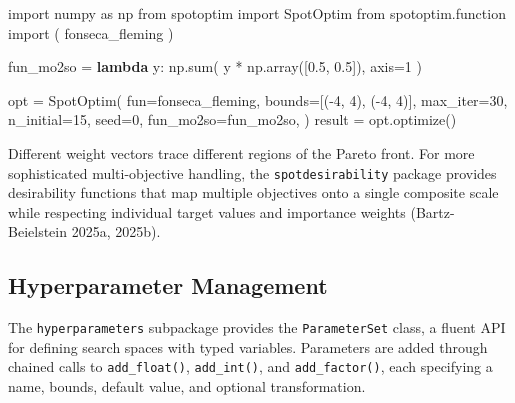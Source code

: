 \documentclass[
  twocolumn]{article}
\newenvironment{Shaded}{\begin{snugshade}}{\end{snugshade}}
\newcommand{\BuiltInTok}[1]{\textcolor[rgb]{0.00,0.23,0.31}{#1}}
\newcommand{\DecValTok}[1]{\textcolor[rgb]{0.68,0.00,0.00}{#1}}
\newcommand{\FloatTok}[1]{\textcolor[rgb]{0.68,0.00,0.00}{#1}}
\newcommand{\ImportTok}[1]{\textcolor[rgb]{0.00,0.46,0.62}{#1}}
\newcommand{\KeywordTok}[1]{\textcolor[rgb]{0.00,0.23,0.31}{\textbf{#1}}}
\newcommand{\NormalTok}[1]{\textcolor[rgb]{0.00,0.23,0.31}{#1}}
\newcommand{\OperatorTok}[1]{\textcolor[rgb]{0.37,0.37,0.37}{#1}}
\begin{document}
\begin{Shaded}
\begin{Highlighting}[]
\ImportTok{import}\NormalTok{ numpy }\ImportTok{as}\NormalTok{ np}
\ImportTok{from}\NormalTok{ spotoptim }\ImportTok{import}\NormalTok{ SpotOptim}
\ImportTok{from}\NormalTok{ spotoptim.function }\ImportTok{import}\NormalTok{ (}
\NormalTok{    fonseca\_fleming}
\NormalTok{)}

\NormalTok{fun\_mo2so }\OperatorTok{=} \KeywordTok{lambda}\NormalTok{ y: np.}\BuiltInTok{sum}\NormalTok{(}
\NormalTok{    y }\OperatorTok{*}\NormalTok{ np.array([}\FloatTok{0.5}\NormalTok{, }\FloatTok{0.5}\NormalTok{]), axis}\OperatorTok{=}\DecValTok{1}
\NormalTok{)}

\NormalTok{opt }\OperatorTok{=}\NormalTok{ SpotOptim(}
\NormalTok{    fun}\OperatorTok{=}\NormalTok{fonseca\_fleming,}
\NormalTok{    bounds}\OperatorTok{=}\NormalTok{[(}\OperatorTok{{-}}\DecValTok{4}\NormalTok{, }\DecValTok{4}\NormalTok{), (}\OperatorTok{{-}}\DecValTok{4}\NormalTok{, }\DecValTok{4}\NormalTok{)],}
\NormalTok{    max\_iter}\OperatorTok{=}\DecValTok{30}\NormalTok{,}
\NormalTok{    n\_initial}\OperatorTok{=}\DecValTok{15}\NormalTok{,}
\NormalTok{    seed}\OperatorTok{=}\DecValTok{0}\NormalTok{,}
\NormalTok{    fun\_mo2so}\OperatorTok{=}\NormalTok{fun\_mo2so,}
\NormalTok{)}
\NormalTok{result }\OperatorTok{=}\NormalTok{ opt.optimize()}
\end{Highlighting}
\end{Shaded}

Different weight vectors trace different regions of the Pareto front.
For more sophisticated multi-objective handling, the
\texttt{spotdesirability} package provides desirability functions that
map multiple objectives onto a single composite scale while respecting
individual target values and importance weights (Bartz-Beielstein 2025a,
2025b).

\subsection{Hyperparameter Management}\label{sec-hyperparams}

The \texttt{hyperparameters} subpackage provides the
\texttt{ParameterSet} class, a fluent API for defining search spaces
with typed variables. Parameters are added through chained calls to
\texttt{add\_float()}, \texttt{add\_int()}, and \texttt{add\_factor()},
each specifying a name, bounds, default value, and optional
transformation.
\end{document}
